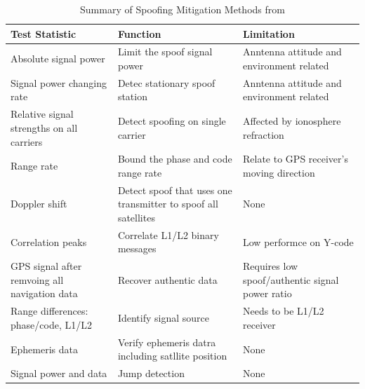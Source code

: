 \renewcommand{\arraystretch}{1.2}
\begin{table}[!h]
    \begin{center}
        \caption{Summary of Spoofing Mitigation Methods from \cite{RN11}}
        \label{tab:GPSMitigationSum}
            \begin{tabular}{ m{3cm} | m{5cm} | m{5cm} }
                \hline
                \textbf{Test Statistic} & \textbf{Function} & \textbf{Limitation} \\
                \hline
                Absolute signal power & Limit the spoof signal power & Anntenna attitude and environment related \\
                Signal power changing rate & Detec stationary spoof station & Anntenna attitude and environment related \\
                Relative signal strengths on all carriers & Detect spoofing on single carrier & Affected by ionosphere refraction \\
                Range rate & Bound the phase and code range rate & Relate to GPS receiver's moving direction \\
                Doppler shift & Detect spoof that uses one transmitter to spoof all satellites & None \\
                Correlation peaks & Correlate L1/L2 binary messages & Low performce on Y-code \\
                GPS signal after remvoing all navigation data & Recover authentic data & Requires low spoof/authentic signal power ratio \\
                Range differences: phase/code, L1/L2 & Identify signal source & Needs to be L1/L2 receiver \\
                Ephemeris data & Verify ephemeris datra including satllite position & None \\
                Signal power and data & Jump detection & None \\
                \hline
            \end{tabular}
    \end{center}
\end{table}
\renewcommand{\arraystretch}{1}


